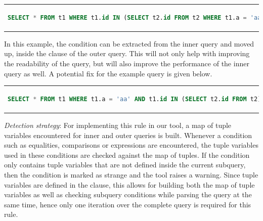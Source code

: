 \begin{center}
\begin{tabular}{c}
\begin{lstlisting}[language=SQL]
SELECT * FROM t1 WHERE t1.id IN (SELECT t2.id FROM t2 WHERE t1.a = 'aa');
\end{lstlisting}
\end{tabular}
\end{center}

In this example, the condition  can be extracted from the inner query and moved up, inside the  clause of the outer query. This will not only help with improving the readability of the query, but will also improve the performance of the inner query as well. A potential fix for the example query is given below.

\begin{center}
\begin{tabular}{c}
\begin{lstlisting}[language=SQL]
SELECT * FROM t1 WHERE t1.a = 'aa' AND t1.id IN (SELECT t2.id FROM t2);
\end{lstlisting}
\end{tabular}
\end{center}

\noindent \emph{Detection strategy}: For implementing this rule in our tool, a map of tuple variables encountered for inner and outer queries is built. Whenever a condition such as equalities, comparisons or  expressions are encountered, the tuple variables used in these conditions are checked against the map of tuples. If the condition only contains tuple variables that are not defined inside the current subquery, then the condition is marked as strange and the tool raises a warning. Since tuple variables are defined in the  clause, this allows for building both the map of tuple variables as well as checking subquery conditions while parsing the query at the same time, hence only one iteration over the complete query is required for this rule.

